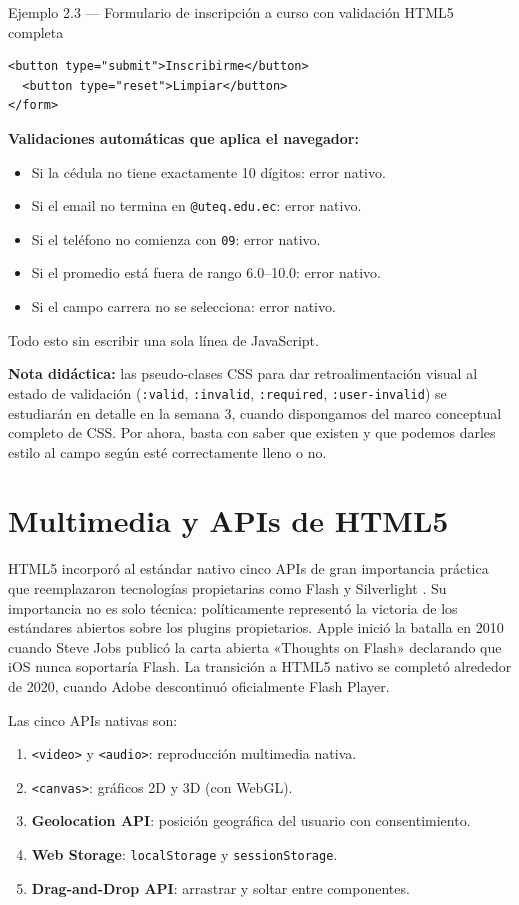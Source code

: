 \documentclass[11pt,a4paper,openany]{book}
\begin{document}
\begin{cajaejemplo}{Ejemplo 2.3 --- Formulario de inscripción a curso con validación HTML5 completa}
\begin{lstlisting}[style=html,caption={inscripcion.html (formulario funcional)},label=lst:2.6]
  <button type="submit">Inscribirme</button>
  <button type="reset">Limpiar</button>
</form>
\end{lstlisting}

\textbf{Validaciones automáticas que aplica el navegador:}
\begin{itemize}
\item Si la cédula no tiene exactamente 10 dígitos: error nativo.
\item Si el email no termina en \texttt{@uteq.edu.ec}: error nativo.
\item Si el teléfono no comienza con \texttt{09}: error nativo.
\item Si el promedio está fuera de rango 6.0--10.0: error nativo.
\item Si el campo carrera no se selecciona: error nativo.
\end{itemize}
Todo esto sin escribir una sola línea de JavaScript.
\end{cajaejemplo}

\textbf{Nota didáctica:} las pseudo-clases CSS para dar
retroalimentación visual al estado de validación (\texttt{:valid},
\texttt{:invalid}, \texttt{:required}, \texttt{:user-invalid}) se
estudiarán en detalle en la semana 3, cuando dispongamos del marco
conceptual completo de CSS. Por ahora, basta con saber que existen y
que podemos darles estilo al campo según esté correctamente lleno o
no.

\section{Multimedia y APIs de HTML5}

HTML5 incorporó al estándar nativo cinco APIs de gran importancia
práctica que reemplazaron tecnologías propietarias como Flash y
Silverlight \cite{macdonald2018css}. Su importancia no es solo
técnica: políticamente representó la victoria de los estándares
abiertos sobre los plugins propietarios. Apple inició la batalla en
2010 cuando Steve Jobs publicó la carta abierta «Thoughts on
Flash» \cite{jobs2010flash} declarando que iOS nunca soportaría
Flash. La transición a HTML5 nativo se completó alrededor de 2020,
cuando Adobe descontinuó oficialmente Flash Player.

Las cinco APIs nativas son:

\begin{enumerate}
\item \texttt{<video>} y \texttt{<audio>}: reproducción multimedia
nativa.
\item \texttt{<canvas>}: gráficos 2D y 3D (con WebGL).
\item \textbf{Geolocation API}: posición geográfica del usuario con
consentimiento.
\item \textbf{Web Storage}: \texttt{localStorage} y
\texttt{sessionStorage}.
\item \textbf{Drag-and-Drop API}: arrastrar y soltar entre
componentes.
\end{enumerate}
\end{document}
